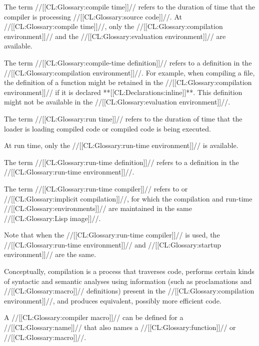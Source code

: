 The term //[[CL:Glossary:compile time]]// refers to the duration of time that the compiler is processing //[[CL:Glossary:source code]]//. At //[[CL:Glossary:compile time]]//, only the //[[CL:Glossary:compilation environment]]//  and  the //[[CL:Glossary:evaluation environment]]// are available.

The term //[[CL:Glossary:compile-time definition]]// refers to a definition in the //[[CL:Glossary:compilation environment]]//. For example, when compiling a file,  the definition of a function might be retained in the //[[CL:Glossary:compilation environment]]//  if it is declared **[[CL:Declarations:inline]]**.  This definition might not be available in the //[[CL:Glossary:evaluation environment]]//.

The term //[[CL:Glossary:run time]]// refers to the duration of time that the loader is loading compiled code or compiled code is being executed.

At run time, only the //[[CL:Glossary:run-time environment]]// is available.

The term //[[CL:Glossary:run-time definition]]// refers to a definition in the //[[CL:Glossary:run-time environment]]//.

The term //[[CL:Glossary:run-time compiler]]// refers to  or //[[CL:Glossary:implicit compilation]]//, for which the compilation and run-time  //[[CL:Glossary:environments]]// are maintained in the same //[[CL:Glossary:Lisp image]]//.

Note that when the //[[CL:Glossary:run-time compiler]]// is used, the //[[CL:Glossary:run-time environment]]//  and //[[CL:Glossary:startup environment]]//  are the same.

\endsubSection%
   
  Conceptually, compilation is a process that traverses code, performs certain kinds of syntactic and semantic analyses using information (such as proclamations and //[[CL:Glossary:macro]]// definitions) present in the //[[CL:Glossary:compilation environment]]//, and produces equivalent, possibly more efficient code.


 

A //[[CL:Glossary:compiler macro]]// can be defined for a //[[CL:Glossary:name]]// that also names a //[[CL:Glossary:function]]// or //[[CL:Glossary:macro]]//.

